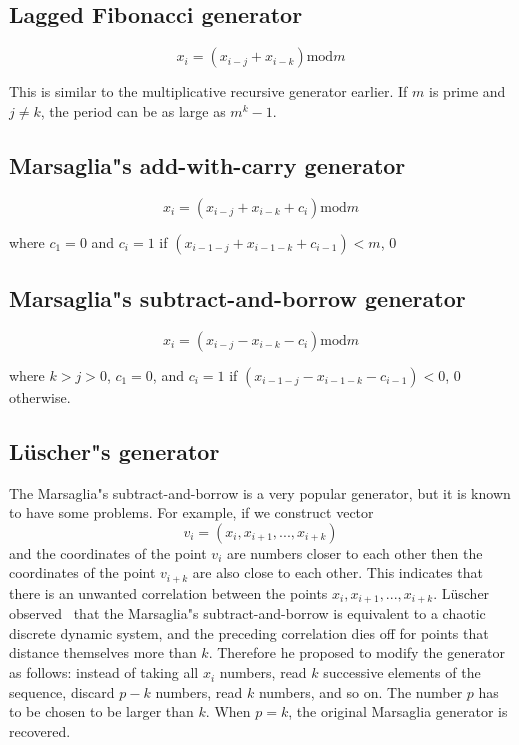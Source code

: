 \documentclass[justified, sixbynine]{tufte-book}
\theoremstyle{plain}%
\newtheorem * {corollary}{Corollary}
\theoremstyle{definition}
\theoremstyle{remark}
\newtheorem * {remark}{Remark}
\newtheorem * {note}{Note}
\begin{document}
\begin{fullwidth}
\goodbreak\subsection{Lagged Fibonacci generator}

\begin{equation}
x_i=(x_{i-j}+x_{i-k})\textrm{mod}m
\end{equation}

This is similar to the multiplicative recursive generator earlier. If $m$ is
prime and $j\neq k$, the period can be as large as $m^k-1$.

\goodbreak\subsection{Marsaglia"s add-with-carry generator}

\begin{equation}
x_i=(x_{i-j}+x_{i-k}+c_i)\textrm{mod}m
\end{equation}

where $c_1=0$ and $c_i=1$ if $(x_{i-1-j}+x_{i-1-k}+c_{i-1})<m$, $0$

\goodbreak\subsection{Marsaglia"s subtract-and-borrow generator}

\begin{equation}
x_i=(x_{i-j}-x_{i-k}-c_i)\textrm{mod}m
\end{equation}

where $k>j>0$, $c_1=0$, and $c_i=1$ if $(x_{i-1-j}-x_{i-1-k}-c_{i-1})<0$, $0$
otherwise.

\goodbreak\subsection{L\"uscher"s generator}

The Marsaglia"s subtract-and-borrow is a very popular generator, but it is known
to have some problems. For example, if we construct vector
\begin{equation}
v_i=(x_i, x_{i+1}, ..., x_{i+k})
\end{equation}
and the coordinates of the point $v_i$ are numbers closer to each other then
the coordinates of the point $v_{i+k}$ are also close to each other. This
indicates that there is an unwanted correlation between the points $%
x_i, x_{i+1}, ..., x_{i+k}$. L\"uscher observed~\cite{lusher} that the Marsaglia"s
subtract-and-borrow is equivalent to a chaotic discrete dynamic system, and
the preceding correlation dies off for points that distance themselves more than $k$. Therefore
he proposed to modify the generator as follows: instead of taking all $x_i$
numbers, read $k$ successive elements of the sequence, discard $p-k$
numbers, read $k$ numbers, and so on. The number $p$ has to be chosen to be
larger than $k$. When $p=k$, the original Marsaglia generator is recovered.


\end{fullwidth}
\end{document}
